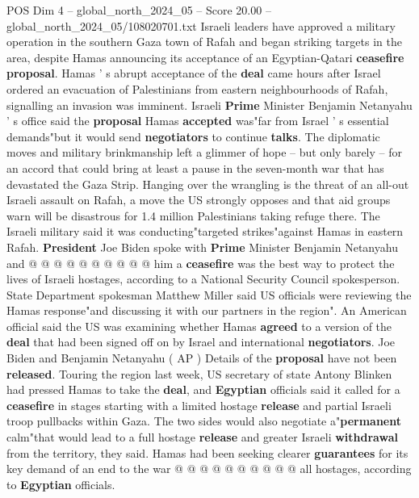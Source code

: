 \begin{textsample}{POS Dim 4 – global\_north\_2024\_05 – Score 20.00 – global\_north\_2024\_05/108020701.txt}  \label{ex:f4_pos_344}
Israeli leaders have approved a military operation in the southern Gaza town of Rafah and began striking targets in the area, despite Hamas announcing its acceptance of an Egyptian-Qatari \textbf{ceasefire} \textbf{proposal}.
Hamas ' s abrupt acceptance of the \textbf{deal} came hours after Israel ordered an evacuation of Palestinians from eastern neighbourhoods of Rafah, signalling an invasion was imminent.
Israeli \textbf{Prime} Minister Benjamin Netanyahu ' s office said the \textbf{proposal} Hamas \textbf{accepted} was"far from Israel ' s essential demands"but it would send \textbf{negotiators} to continue \textbf{talks}.
The diplomatic moves and military brinkmanship left a glimmer of hope -- but only barely -- for an accord that could bring at least a pause in the seven-month war that has devastated the Gaza Strip.
Hanging over the wrangling is the threat of an all-out Israeli assault on Rafah, a move the US strongly opposes and that aid groups warn will be disastrous for 1.4 million Palestinians taking refuge there.
The Israeli military said it was conducting"targeted strikes"against Hamas in eastern Rafah. \textbf{President} Joe Biden spoke with \textbf{Prime} Minister Benjamin Netanyahu and @ @ @ @ @ @ @ @ @ @ him a \textbf{ceasefire} was the best way to protect the lives of Israeli hostages, according to a National Security Council spokesperson.
State Department spokesman Matthew Miller said US officials were reviewing the Hamas response"and discussing it with our partners in the region".
An American official said the US was examining whether Hamas \textbf{agreed} to a version of the \textbf{deal} that had been signed off on by Israel and international \textbf{negotiators}.
Joe Biden and Benjamin Netanyahu ( AP ) Details of the \textbf{proposal} have not been \textbf{released}.
Touring the region last week, US secretary of state Antony Blinken had pressed Hamas to take the \textbf{deal}, and \textbf{Egyptian} officials said it called for a \textbf{ceasefire} in stages starting with a limited hostage \textbf{release} and partial Israeli troop pullbacks within Gaza.
The two sides would also negotiate a"\textbf{permanent} calm"that would lead to a full hostage \textbf{release} and greater Israeli \textbf{withdrawal} from the territory, they said.
Hamas had been seeking clearer \textbf{guarantees} for its key demand of an end to the war @ @ @ @ @ @ @ @ @ @ all hostages, according to \textbf{Egyptian} officials.

\end{textsample}
